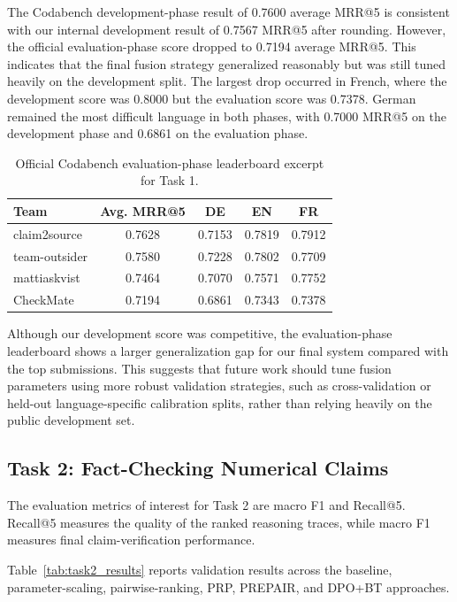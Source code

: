 \documentclass[
]{ceurart}
\begin{document}
The Codabench development-phase result of 0.7600 average MRR@5 is consistent with our internal development result of 0.7567 MRR@5 after rounding. However, the official evaluation-phase score dropped to 0.7194 average MRR@5. This indicates that the final fusion strategy generalized reasonably but was still tuned heavily on the development split. The largest drop occurred in French, where the development score was 0.8000 but the evaluation score was 0.7378. German remained the most difficult language in both phases, with 0.7000 MRR@5 on the development phase and 0.6861 on the evaluation phase.

\begin{table}[h]
  \caption{Official Codabench evaluation-phase leaderboard excerpt for Task 1.}
  \label{tab:task1_leaderboard}
  \centering
  \begin{tabular}{lcccc}
    \toprule
    Team & Avg. MRR@5 & DE & EN & FR \\
    \midrule
    claim2source & 0.7628 & 0.7153 & 0.7819 & 0.7912 \\
    team-outsider & 0.7580 & 0.7228 & 0.7802 & 0.7709 \\
    mattiaskvist & 0.7464 & 0.7070 & 0.7571 & 0.7752 \\
    CheckMate & 0.7194 & 0.6861 & 0.7343 & 0.7378 \\
    \bottomrule
  \end{tabular}
\end{table}

Although our development score was competitive, the evaluation-phase leaderboard shows a larger generalization gap for our final system compared with the top submissions. This suggests that future work should tune fusion parameters using more robust validation strategies, such as cross-validation or held-out language-specific calibration splits, rather than relying heavily on the public development set.

\subsection{Task 2: Fact-Checking Numerical Claims}

The evaluation metrics of interest for Task 2 are macro F1 and Recall@5. Recall@5 measures the quality of the ranked reasoning traces, while macro F1 measures final claim-verification performance.

Table~\ref{tab:task2_results} reports validation results across the baseline, parameter-scaling, pairwise-ranking, PRP, PREPAIR, and DPO+BT approaches.
\end{document}
